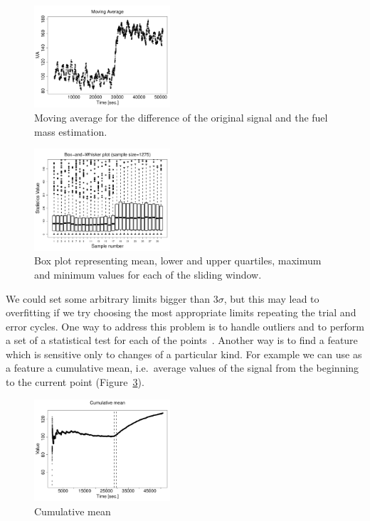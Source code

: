 \begin{figure}[htb!]
\includegraphics[width=0.45\textwidth]{articles/pics/cfb_paper/OMF/OMFrma}
\caption{Moving average for the difference of the original signal and the fuel mass estimation.}\label{figure19}
\end{figure}
\begin{figure}[htb!]
\includegraphics[width=0.45\textwidth]{articles/pics/cfb_paper/OMF/OMFboxplot}
\caption{Box plot representing mean, lower and upper quartiles, maximum and minimum values for each of the sliding window.}\label{figure20}
\end{figure}

We could set some arbitrary limits bigger than $3\sigma$, but this may lead to overfitting if we try choosing the most appropriate limits repeating the trial and error cycles.
One way to address this problem is to handle outliers and to perform a set of a statistical test for each of the points~\cite{BakkerSensorsKDD09}.
Another way is to find a feature which is sensitive only to changes of a particular kind.
For example we can use as a feature a cumulative mean, i.e.\ average values of the signal from the beginning to the current point (Figure~\ref{figure21}).

\begin{figure}[htb!]
\includegraphics[width=0.45\textwidth]{articles/pics/cfb_paper/OMF/OMFcumulativemean}
\caption{Cumulative mean}\label{figure21}
\end{figure}

